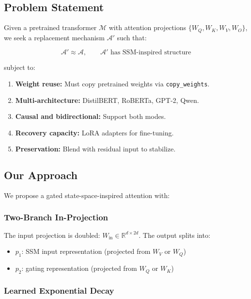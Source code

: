 \subsection{Problem Statement}

Given a pretrained transformer $\mathcal{M}$ with attention projections 
$\{W_Q, W_K, W_V, W_O\}$, we seek a replacement mechanism $\mathcal{A}'$ such 
that:

\[
\mathcal{A}' \approx \mathcal{A}, \qquad
\mathcal{A}' \text{ has SSM-inspired structure}
\tag{1.1}
\]

subject to:

\begin{enumerate}
\item \textbf{Weight reuse:} Must copy pretrained weights via \texttt{copy\_weights}.
\item \textbf{Multi-architecture:} DistilBERT, RoBERTa, GPT-2, Qwen.
\item \textbf{Causal and bidirectional:} Support both modes.
\item \textbf{Recovery capacity:} LoRA adapters for fine-tuning.
\item \textbf{Preservation:} Blend with residual input to stabilize.

\end{enumerate}
\subsection{Our Approach}

We propose a gated state-space-inspired attention with:

\subsubsection{Two-Branch In-Projection}

The input projection is doubled: $W_\text{in} \in \mathbb{R}^{d \times 2d}$. 
The output splits into:

\begin{itemize}
\item $p_1$: SSM input representation (projected from $W_V$ or $W_Q$)
\item $p_2$: gating representation (projected from $W_Q$ or $W_K$)

\end{itemize}
\subsubsection{Learned Exponential Decay}

